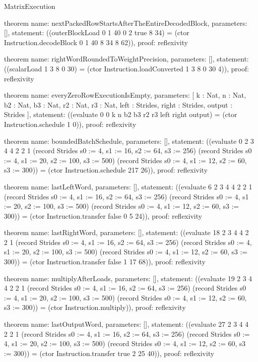 \begin{lexlean}{MatrixExecution}
\begin{semanticmodule}
theorem{
  name: nextPackedRowStartsAfterTheEntireDecodedBlock,
  parameters: [],
  statement: ((outerBlockLoad 0 1 40 0 2 true 8 34) = (ctor Instruction.decodeBlock 0 1 40 8 34 8 62)),
  proof: reflexivity{}
}

theorem{
  name: rightWordRoundedToWeightPrecision,
  parameters: [],
  statement: ((scalarLoad 1 3 8 0 30) = (ctor Instruction.loadConverted 1 3 8 0 30 4)),
  proof: reflexivity{}
}

theorem{
  name: everyZeroRowExecutionIsEmpty,
  parameters: [
    k : Nat,
    n : Nat,
    b2 : Nat,
    b3 : Nat,
    r2 : Nat,
    r3 : Nat,
    left : Strides,
    right : Strides,
    output : Strides
  ],
  statement: ((evaluate 0 0 k n b2 b3 r2 r3 left right output) = (ctor Instruction.schedule 1 0)),
  proof: reflexivity{}
}

theorem{
  name: boundedBatchSchedule,
  parameters: [],
  statement: ((evaluate 0 2 3 4 4 2 2 1 (record Strides {s0 := 4, s1 := 16, s2 := 64, s3 := 256}) (record Strides {s0 := 4, s1 := 20, s2 := 100, s3 := 500}) (record Strides {s0 := 4, s1 := 12, s2 := 60, s3 := 300})) = (ctor Instruction.schedule 217 26)),
  proof: reflexivity{}
}

theorem{
  name: lastLeftWord,
  parameters: [],
  statement: ((evaluate 6 2 3 4 4 2 2 1 (record Strides {s0 := 4, s1 := 16, s2 := 64, s3 := 256}) (record Strides {s0 := 4, s1 := 20, s2 := 100, s3 := 500}) (record Strides {s0 := 4, s1 := 12, s2 := 60, s3 := 300})) = (ctor Instruction.transfer false 0 5 24)),
  proof: reflexivity{}
}

theorem{
  name: lastRightWord,
  parameters: [],
  statement: ((evaluate 18 2 3 4 4 2 2 1 (record Strides {s0 := 4, s1 := 16, s2 := 64, s3 := 256}) (record Strides {s0 := 4, s1 := 20, s2 := 100, s3 := 500}) (record Strides {s0 := 4, s1 := 12, s2 := 60, s3 := 300})) = (ctor Instruction.transfer false 1 17 68)),
  proof: reflexivity{}
}

theorem{
  name: multiplyAfterLoads,
  parameters: [],
  statement: ((evaluate 19 2 3 4 4 2 2 1 (record Strides {s0 := 4, s1 := 16, s2 := 64, s3 := 256}) (record Strides {s0 := 4, s1 := 20, s2 := 100, s3 := 500}) (record Strides {s0 := 4, s1 := 12, s2 := 60, s3 := 300})) = (ctor Instruction.multiply)),
  proof: reflexivity{}
}

theorem{
  name: lastOutputWord,
  parameters: [],
  statement: ((evaluate 27 2 3 4 4 2 2 1 (record Strides {s0 := 4, s1 := 16, s2 := 64, s3 := 256}) (record Strides {s0 := 4, s1 := 20, s2 := 100, s3 := 500}) (record Strides {s0 := 4, s1 := 12, s2 := 60, s3 := 300})) = (ctor Instruction.transfer true 2 25 40)),
  proof: reflexivity{}
}


\end{semanticmodule}
\end{lexlean}
